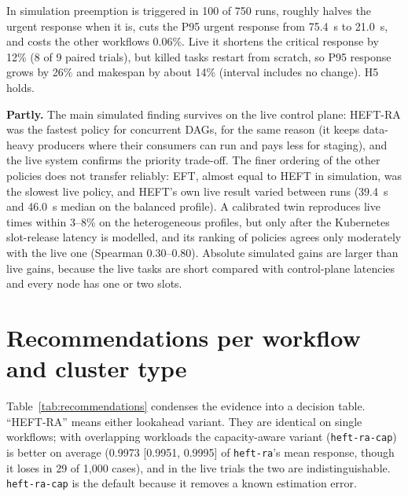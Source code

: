 \documentclass[12pt,a4paper]{report}
\newcommand{\pol}[1]{\texttt{#1}}
\begin{document}
\begin{description}[leftmargin=1.2cm,style=nextline]
      In simulation preemption is triggered in 100 of 750 runs, roughly
      halves the urgent response when it is, cuts the P95 urgent response
      from 75.4~s to 21.0~s, and costs the other workflows 0.06\%. Live it
      shortens the critical response by 12\% (8 of 9 paired trials), but
      killed tasks restart from scratch, so P95 response grows by 26\% and
      makespan by about 14\% (interval includes no change). H5 holds.
\item[RQ6] \textbf{Partly.} The main simulated finding survives on the
      live control plane: HEFT-RA was the fastest policy for concurrent
      DAGs, for the same reason (it keeps data-heavy producers where their
      consumers can run and pays less for staging), and the live system
      confirms the priority trade-off. The finer ordering of the other
      policies does not transfer reliably: EFT, almost equal to HEFT in
      simulation, was the slowest live policy, and HEFT's own live result
      varied between runs (39.4~s and 46.0~s median on the balanced
      profile). A calibrated twin reproduces live
      times within 3--8\% on the heterogeneous profiles, but only after
      the Kubernetes slot-release latency is modelled, and its ranking of
      policies agrees only moderately with the live one (Spearman
      0.30--0.80). Absolute simulated gains are larger than live gains,
      because the live tasks are short compared with control-plane
      latencies and every node has one or two slots.
\end{description}

\section{Recommendations per workflow and cluster type}
\label{sec:recommendations}

Table~\ref{tab:recommendations} condenses the evidence into a decision
table. ``HEFT-RA'' means either lookahead variant. They are identical on
single workflows; with overlapping workloads the capacity-aware variant
(\pol{heft-ra-cap}) is better on average (0.9973 [0.9951, 0.9995] of
\pol{heft-ra}'s mean response, though it loses in 29 of 1,000 cases), and
in the live trials the two are indistinguishable. \pol{heft-ra-cap} is the
default because it removes a known estimation error.
\end{document}
